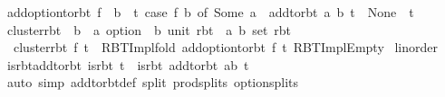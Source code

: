 \begin{isabellebody}
\isanewline
{}\isamarkupfalse%
\ {\isachardoublequoteopen}add{\isacharunderscore}{\kern0pt}option{\isacharunderscore}{\kern0pt}to{\isacharunderscore}{\kern0pt}rbt\ f\ {\isasymequiv}\ {\isacharparenleft}{\kern0pt}{\isasymlambda}b\ {\isacharunderscore}{\kern0pt}\ t{\isachardot}{\kern0pt}\ case\ f\ b\ of\ Some\ a\ {\isasymRightarrow}\ add{\isacharunderscore}{\kern0pt}to{\isacharunderscore}{\kern0pt}rbt\ {\isacharparenleft}{\kern0pt}a{\isacharcomma}{\kern0pt}\ b{\isacharparenright}{\kern0pt}\ t\ {\isacharbar}{\kern0pt}\ None\ {\isasymRightarrow}\ t{\isacharparenright}{\kern0pt}{\isachardoublequoteclose}\isanewline
\isanewline
{}\isamarkupfalse%
\ cluster{\isacharunderscore}{\kern0pt}rbt\ {\isacharcolon}{\kern0pt}{\isacharcolon}{\kern0pt}\ {\isachardoublequoteopen}{\isacharparenleft}{\kern0pt}{\isacharprime}{\kern0pt}b\ {\isasymRightarrow}\ {\isacharprime}{\kern0pt}a\ option{\isacharparenright}{\kern0pt}\ {\isasymRightarrow}\ {\isacharparenleft}{\kern0pt}{\isacharprime}{\kern0pt}b{\isacharcomma}{\kern0pt}\ unit{\isacharparenright}{\kern0pt}\ rbt\ {\isasymRightarrow}\ {\isacharparenleft}{\kern0pt}{\isacharprime}{\kern0pt}a{\isacharcomma}{\kern0pt}\ {\isacharprime}{\kern0pt}b\ set{\isacharparenright}{\kern0pt}\ rbt{\isachardoublequoteclose}\ \isanewline
\ \ {\isachardoublequoteopen}cluster{\isacharunderscore}{\kern0pt}rbt\ f\ t\ {\isacharequal}{\kern0pt}\ RBT{\isacharunderscore}{\kern0pt}Impl{\isachardot}{\kern0pt}fold\ {\isacharparenleft}{\kern0pt}add{\isacharunderscore}{\kern0pt}option{\isacharunderscore}{\kern0pt}to{\isacharunderscore}{\kern0pt}rbt\ f{\isacharparenright}{\kern0pt}\ t\ RBT{\isacharunderscore}{\kern0pt}Impl{\isachardot}{\kern0pt}Empty{\isachardoublequoteclose}\isanewline
\isanewline
{}\isamarkupfalse%
\isanewline
\isanewline
{}\isamarkupfalse%
\ linorder\isanewline
{}\isanewline
\isanewline
{}\isamarkupfalse%
\ is{\isacharunderscore}{\kern0pt}rbt{\isacharunderscore}{\kern0pt}add{\isacharunderscore}{\kern0pt}to{\isacharunderscore}{\kern0pt}rbt{\isacharcolon}{\kern0pt}\ {\isachardoublequoteopen}is{\isacharunderscore}{\kern0pt}rbt\ t\ {\isasymLongrightarrow}\ is{\isacharunderscore}{\kern0pt}rbt\ {\isacharparenleft}{\kern0pt}add{\isacharunderscore}{\kern0pt}to{\isacharunderscore}{\kern0pt}rbt\ ab\ t{\isacharparenright}{\kern0pt}{\isachardoublequoteclose}\isanewline
%
\isadelimproof
\ \ %
\endisadelimproof
%
\isatagproof
{}\isamarkupfalse%
\ {\isacharparenleft}{\kern0pt}auto\ simp{\isacharcolon}{\kern0pt}\ add{\isacharunderscore}{\kern0pt}to{\isacharunderscore}{\kern0pt}rbt{\isacharunderscore}{\kern0pt}def\ split{\isacharcolon}{\kern0pt}\ prod{\isachardot}{\kern0pt}splits\ option{\isachardot}{\kern0pt}splits{\isacharparenright}{\kern0pt}%

\end{isabellebody}
